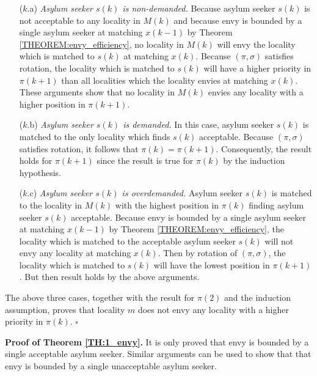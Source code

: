\documentclass[12pt,fleqn]{article}
\begin{document}
\begin{itemize}
\item[($k$.a)] \emph{Asylum seeker $s(k)$ is non-demanded.} Because asylum seeker $s(k)$ is not acceptable to any locality in $M(k)$ and because envy is bounded by a single asylum seeker at matching $x(k-1)$ by Theorem \ref{THEOREM:envy_efficiency}, no locality in $M(k)$ will envy the locality which is matched to $s(k)$ at matching $x(k)$. Because $(\pi,\sigma)$ satisfies rotation, the locality which is matched to $s(k)$ will have a higher priority in $\pi(k+1)$ than all localities which the locality envies at matching $x(k)$. These arguments show that no locality in $M(k)$ envies any locality with a higher position in $\pi(k+1)$.

\item[($k$.b)] \emph{Asylum seeker $s(k)$ is demanded.} In this case, asylum seeker $s(k)$ is matched to the only locality which finds $s(k)$ acceptable. Because $(\pi,\sigma)$ satisfies rotation, it follows that $\pi(k)=\pi(k+1)$. Consequently, the result holds for $\pi(k+1)$ since the result is true for $\pi(k)$ by the induction hypothesis.

\item[($k$.c)] \emph{Asylum seeker $s(k)$ is overdemanded.} Asylum seeker $s(k)$ is matched to the locality in $M(k)$ with the highest position in $\pi(k)$ finding asylum seeker $s(k)$ acceptable. Because envy is bounded by a single asylum seeker at matching $x(k-1)$ by Theorem \ref{THEOREM:envy_efficiency}, the locality which is matched to the acceptable asylum seeker $s(k)$ will not envy any locality at matching $x(k)$. Then by rotation of $(\pi,\sigma)$, the locality which is matched to $s(k)$ will have the lowest position in $\pi(k+1)$. But then result holds by the above arguments.
\end{itemize}

\noindent The above three cases, together with the result for $\pi(2)$ and the induction assumption, proves that locality $m$ does not envy any locality with a higher priority in $\pi(k)$. \hfill $\square$

\medskip

\noindent\textbf{Proof of Theorem \ref{TH:1_envy}.} It is only proved that envy is bounded by a single acceptable asylum seeker. Similar arguments can be used to show that that envy is bounded by a single unacceptable asylum seeker.
\end{document}
